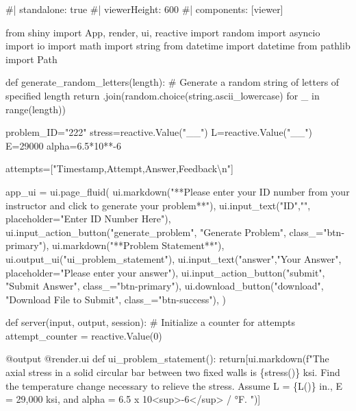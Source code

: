 \documentclass[
  letterpaper,
  DIV=11,
  numbers=noendperiod]{scrreprt}
\newenvironment{Shaded}{\begin{snugshade}}{\end{snugshade}}
\newcommand{\NormalTok}[1]{\textcolor[rgb]{0.00,0.23,0.31}{#1}}
\begin{document}
\begin{Shaded}
\begin{Highlighting}[]
\NormalTok{\#| standalone: true}
\NormalTok{\#| viewerHeight: 600}
\NormalTok{\#| components: [viewer]}

\NormalTok{from shiny import App, render, ui, reactive}
\NormalTok{import random}
\NormalTok{import asyncio}
\NormalTok{import io}
\NormalTok{import math}
\NormalTok{import string}
\NormalTok{from datetime import datetime}
\NormalTok{from pathlib import Path}

\NormalTok{def generate\_random\_letters(length):}
\NormalTok{    \# Generate a random string of letters of specified length}
\NormalTok{    return \textquotesingle{}\textquotesingle{}.join(random.choice(string.ascii\_lowercase) for \_ in range(length)) }

\NormalTok{problem\_ID="222"}
\NormalTok{stress=reactive.Value("\_\_")}
\NormalTok{L=reactive.Value("\_\_")}
\NormalTok{E=29000}
\NormalTok{alpha=6.5*10**{-}6}

\NormalTok{attempts=["Timestamp,Attempt,Answer,Feedback\textbackslash{}n"]}

\NormalTok{app\_ui = ui.page\_fluid(}
\NormalTok{    ui.markdown("**Please enter your ID number from your instructor and click to generate your problem**"),}
\NormalTok{    ui.input\_text("ID","", placeholder="Enter ID Number Here"),}
\NormalTok{    ui.input\_action\_button("generate\_problem", "Generate Problem", class\_="btn{-}primary"),}
\NormalTok{    ui.markdown("**Problem Statement**"),}
\NormalTok{    ui.output\_ui("ui\_problem\_statement"),}
\NormalTok{    ui.input\_text("answer","Your Answer", placeholder="Please enter your answer"),}
\NormalTok{    ui.input\_action\_button("submit", "Submit Answer", class\_="btn{-}primary"),}
\NormalTok{    ui.download\_button("download", "Download File to Submit", class\_="btn{-}success"),}
\NormalTok{)}


\NormalTok{def server(input, output, session):}
\NormalTok{    \# Initialize a counter for attempts}
\NormalTok{    attempt\_counter = reactive.Value(0)}

\NormalTok{    @output}
\NormalTok{    @render.ui}
\NormalTok{    def ui\_problem\_statement():}
\NormalTok{        return[ui.markdown(f"The axial stress in a solid circular bar between two fixed walls is \{stress()\} ksi. Find the temperature change necessary to relieve the stress. Assume L = \{L()\} in., E = 29,000 ksi, and alpha = 6.5 x 10\textless{}sup\textgreater{}{-}6\textless{}/sup\textgreater{} / °F. ")]}
    

\end{Highlighting}
\end{Shaded}
\end{document}
